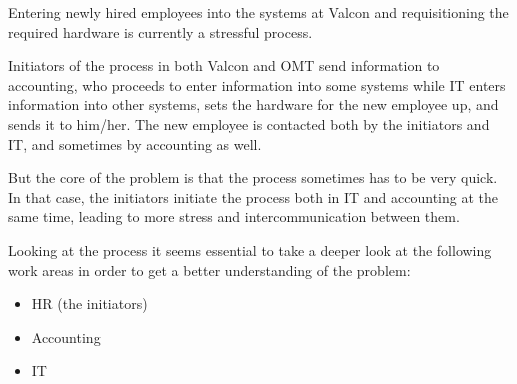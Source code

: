 Entering newly hired employees into the systems at Valcon and requisitioning the required hardware is currently a stressful process.

Initiators of the process in both Valcon and OMT send information to accounting, who proceeds to enter information into some systems while IT enters information into other systems, sets the hardware for the new employee up, and sends it to him/her.
The new employee is contacted both by the initiators and IT, and sometimes by accounting as well.

But the core of the problem is that the process sometimes has to be very quick.
In that case, the initiators initiate the process both in IT and accounting at the same time, leading to more stress and intercommunication between them.

Looking at the process it seems essential to take a deeper look at the following work areas in order to get a better understanding of the problem:
\begin{itemize}
\item HR (the initiators)
\item Accounting
\item IT
\end{itemize}